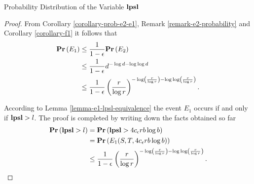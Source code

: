 \begin{section}{Probability Distribution of the Variable \texorpdfstring{$\mathbf{lpsl}$}{lpsl}}
\begin{proof}
From Corollary \ref{corollary-prob-e2-e1}, Remark \ref{remark-e2-probability} and Corollary \ref{corollary-f1} it follows that
\[
\begin{split}
\mathbf{Pr}\left(E_1\right)
	& \leq \frac{1}{1 - \epsilon} \mathbf{Pr}\left(E_2\right) \\
	& \leq \frac{1}{1 - \epsilon} d ^ {-\log d - \log \log d} \\ 
	& \leq \frac{1}{1 - \epsilon} \left(\frac{r}{\log r}\right)^{-\log \left(\frac{r}{\log r}\right) - \log \log \left(\frac{r}{\log r}\right)} \text{.}
\end{split}
\]

According to Lemma \ref{lemma-e1-lpsl-equivalence} the event $E_1$ occurs if and only if $\mathbf{lpsl} > l$. The proof is completed by writing down the facts obtained so far
\[
\begin{split}
\mathbf{Pr}\left(\mathbf{lpsl} > l\right) 
	& = \mathbf{Pr}\left(\mathbf{lpsl} > 4c_{\epsilon} r b \log b\right) \\
	& = \mathbf{Pr}\left(E_1(S, T, 4c_{\epsilon} r b \log b)\right) \\
	& \leq \frac{1}{1 - \epsilon} \left(\frac{r}{\log r}\right)^{-\log \left(\frac{r}{\log r}\right) - \log \log \left(\frac{r}{\log r}\right)} \text{.}
\end{split}
\]
\end{proof}


\end{section}
